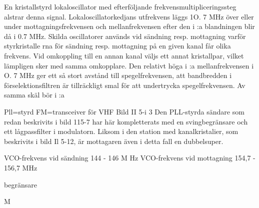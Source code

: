 En kristallstyrd lokaloscillator med efterföljande frekvensmultipliceringssteg alstrar
denna signal.
Lokaloscillatorkedjans utfrekvens läggs
1O. 7 MHz över eller under mottagningsfrekvensen och mellanfrekvensen efter den i :a
blandningen blir då i 0.7 MHz. Skilda oscillatorer används vid sändning resp. mottagning varför styrkristalle rna för sändning resp.
mottagning på en given kanal får olika frekvens. Vid omkoppling till en annan kanal
väljs ett annat kristallpar, vilket lämpligen
sker med samma omkopplare.
Den relativt höga i :a mellanfrekvensen
i O. 7 MHz ger ett så stort avstånd till spegelfrekvensen, att bandbredden i förselektionsfiltren är tillräckligt smal för att undertrycka
spegelfrekvensen. Av samma skäl bör i :a

Pll=styrd FM=transceiver för VHF
Bild II 5-i 3
Den PLL-styrda sändare som redan beskrivits i bild 115-7 har här kompletterats med en
svingbegränsare och ett lågpassfilter i modulatorn. Liksom i den station med kanalkristalier, som beskrivits i bild Il 5-12, är mottagaren även i detta fall en dubbelsuper.

VCO-frekvens vid sändning
144 - 146 M Hz
VCO-frekvens vid mottagning 154,7 - 156,7 MHz

begränsare

M

